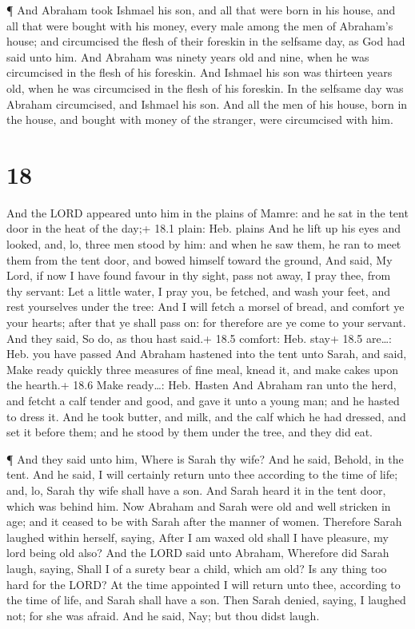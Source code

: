  ¶ And Abraham took Ishmael his son, and all that were born
in his house, and all that were bought with his money, every male among
the men of Abraham's house; and circumcised the flesh of their foreskin
in the selfsame day, as God had said unto him.  And Abraham
was ninety years old and nine, when he was circumcised in the flesh of
his foreskin.  And Ishmael his son was thirteen years old,
when he was circumcised in the flesh of his foreskin.  In
the selfsame day was Abraham circumcised, and Ishmael his son.
 And all the men of his house, born in the house, and
bought with money of the stranger, were circumcised with him.

\hypertarget{section-17}{%
\section{18}\label{section-17}}

 And the LORD appeared unto him in the plains of Mamre: and
he sat in the tent door in the heat of the day;+ 18.1 plain: Heb. plains
 And he lift up his eyes and looked, and, lo, three men
stood by him: and when he saw them, he ran to meet them from the tent
door, and bowed himself toward the ground,  And said, My
Lord, if now I have found favour in thy sight, pass not away, I pray
thee, from thy servant:  Let a little water, I pray you, be
fetched, and wash your feet, and rest yourselves under the tree:
 And I will fetch a morsel of bread, and comfort ye your
hearts; after that ye shall pass on: for therefore are ye come to your
servant. And they said, So do, as thou hast said.+ 18.5 comfort: Heb.
stay+ 18.5 are\ldots: Heb. you have passed  And Abraham
hastened into the tent unto Sarah, and said, Make ready quickly three
measures of fine meal, knead it, and make cakes upon the hearth.+ 18.6
Make ready\ldots: Heb. Hasten  And Abraham ran unto the
herd, and fetcht a calf tender and good, and gave it unto a young man;
and he hasted to dress it.  And he took butter, and milk,
and the calf which he had dressed, and set it before them; and he stood
by them under the tree, and they did eat.

 ¶ And they said unto him, Where is Sarah thy wife? And he
said, Behold, in the tent.  And he said, I will certainly
return unto thee according to the time of life; and, lo, Sarah thy wife
shall have a son. And Sarah heard it in the tent door, which was behind
him.  Now Abraham and Sarah were old and well stricken in
age; and it ceased to be with Sarah after the manner of women.
 Therefore Sarah laughed within herself, saying, After I am
waxed old shall I have pleasure, my lord being old also? 
And the LORD said unto Abraham, Wherefore did Sarah laugh, saying, Shall
I of a surety bear a child, which am old?  Is any thing too
hard for the LORD? At the time appointed I will return unto thee,
according to the time of life, and Sarah shall have a son. 
Then Sarah denied, saying, I laughed not; for she was afraid. And he
said, Nay; but thou didst laugh.


